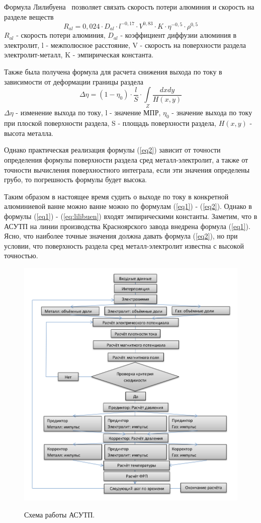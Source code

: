 \documentclass{article}
\begin{document}
Формула Лилибуена~\cite{litlink:Lillebuen} позволяет связать скорость потери алюминия и скорость на разделе веществ
\begin{equation}\label{eq:lilibuen}
R_{al} = 0,024 \cdot D_{al} \cdot l^{-0,17} \cdot V^{0,83} \cdot K \cdot \eta^{-0,5} \cdot \rho^{0,5}
\end{equation}
$R_{al}$ - скорость потери алюминия, $D_{al}$ - коэффициент диффузии алюминия в электролит, l - межполюсное расстояние, V - скорость на поверхности раздела электролит-металл, K - эмпирическая константа.

Также была получена формула для расчета снижения выхода по току в зависимости от деформации границы раздела~\cite{litlink:derkach2}
\begin{equation} \label{eq2}
\Delta \eta = (1- \eta_0) \cdot \frac{l}{S} \cdot \int\limits_Z \frac{dxdy}{H(x,y)}
\end{equation}
$\Delta \eta$ - изменение выхода по току, l - значение МПР, $\eta_0$ - значение выхода по току при плоской поверхности раздела, S - площадь  поверхности раздела, $H(x,y)$ - высота металла.

Однако практическая реализация формулы (\ref{eq2}) зависит от точности определения формулы поверхности раздела сред металл-электролит, а также от точности вычисления поверхностного интеграла, если эти значения определены грубо, то погрешность формулы будет высока.

Таким образом в настоящее время судить о выходе по току в конкретной алюминиевой ванне можно ванне можно по формулам (\ref{eq1}) - (\ref{eq2}). Однако в формулы (\ref{eq1}) - (\ref{eq:lilibuen}) входят эмпирическими константы. Заметим, что в АСУТП на линии производства Красноярского завода внедрена формула (\ref{eq1}). Ясно, что наиболее точные значения должна давать формула (\ref{eq2}), но при условии, что поверхность раздела сред металл-электролит известна с высокой точностью.

\begin{figure}[H]
\centering
\includegraphics[width=0.8\linewidth]{scheme.png}
\caption[]{}
\label{fig:ASUTPscheme}
Схема работы АСУТП.
\end{figure}
\end{document}
